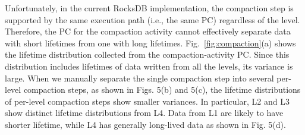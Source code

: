 
Unfortunately, in the current RocksDB implementation, the compaction step is supported 
by the same execution path (i.e., the same PC) regardless of the level.
Therefore, the PC for the compaction activity cannot effectively separate data with 
short lifetimes from one with long lifetimes.
Fig.~\ref{fig:compaction}(a) shows 
the lifetime distribution collected from the compaction-activity PC.  
Since this distribution includes lifetimes of data written from all the levels, 
its variance is large.  
When we manually separate the single compaction step into several per-level compaction steps, 
as shown in Figs. 5(b) and 5(c), the lifetime distributions of per-level compaction steps 
show smaller variances.   
In particular, L2 and L3 show distinct lifetime distributions from L4.
Data from L1 are likely to have shorter lifetime, while L4 has generally
long-lived data as shown in Fig. 5(d).

